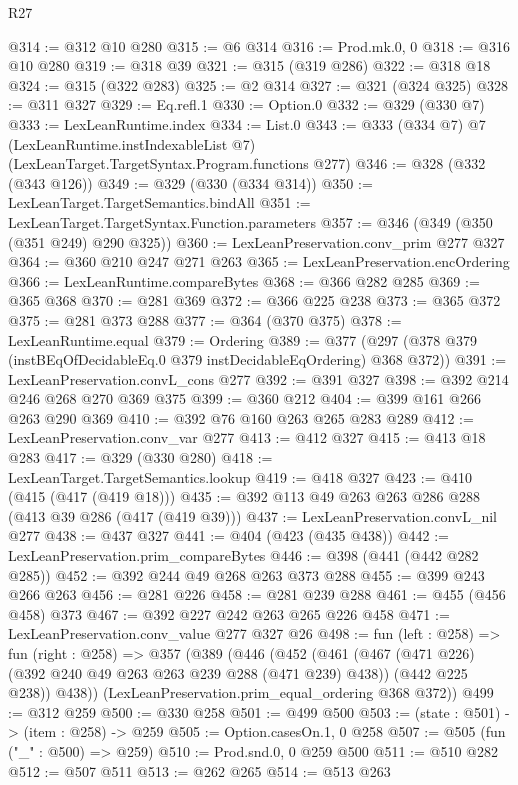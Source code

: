\begin{lexlean}{R27}
\begin{coremodule}
@314 := @312 @10 @280
@315 := @6 @314
@316 := Prod.mk.{0, 0}
@318 := @316 @10 @280
@319 := @318 @39
@321 := @315 (@319 @286)
@322 := @318 @18
@324 := @315 (@322 @283)
@325 := @2 @314
@327 := @321 (@324 @325)
@328 := @311 @327
@329 := Eq.refl.{1}
@330 := Option.{0}
@332 := @329 (@330 @7)
@333 := LexLeanRuntime.index
@334 := List.{0}
@343 := @333
    (@334 @7)
    @7
    (LexLeanRuntime.instIndexableList @7)
    (LexLeanTarget.TargetSyntax.Program.functions @277)
@346 := @328 (@332 (@343 @126))
@349 := @329 (@330 (@334 @314))
@350 := LexLeanTarget.TargetSemantics.bindAll
@351 := LexLeanTarget.TargetSyntax.Function.parameters
@357 := @346 (@349 (@350 (@351 @249) @290 @325))
@360 := LexLeanPreservation.conv_prim @277 @327
@364 := @360 @210 @247 @271 @263
@365 := LexLeanPreservation.encOrdering
@366 := LexLeanRuntime.compareBytes
@368 := @366 @282 @285
@369 := @365 @368
@370 := @281 @369
@372 := @366 @225 @238
@373 := @365 @372
@375 := @281 @373 @288
@377 := @364 (@370 @375)
@378 := LexLeanRuntime.equal
@379 := Ordering
@389 := @377 (@297 (@378 @379 (instBEqOfDecidableEq.{0} @379 instDecidableEqOrdering) @368 @372))
@391 := LexLeanPreservation.convL_cons @277
@392 := @391 @327
@398 := @392 @214 @246 @268 @270 @369 @375
@399 := @360 @212
@404 := @399 @161 @266 @263 @290 @369
@410 := @392 @76 @160 @263 @265 @283 @289
@412 := LexLeanPreservation.conv_var @277
@413 := @412 @327
@415 := @413 @18 @283
@417 := @329 (@330 @280)
@418 := LexLeanTarget.TargetSemantics.lookup
@419 := @418 @327
@423 := @410 (@415 (@417 (@419 @18)))
@435 := @392 @113 @49 @263 @263 @286 @288 (@413 @39 @286 (@417 (@419 @39)))
@437 := LexLeanPreservation.convL_nil @277
@438 := @437 @327
@441 := @404 (@423 (@435 @438))
@442 := LexLeanPreservation.prim_compareBytes
@446 := @398 (@441 (@442 @282 @285))
@452 := @392 @244 @49 @268 @263 @373 @288
@455 := @399 @243 @266 @263
@456 := @281 @226
@458 := @281 @239 @288
@461 := @455 (@456 @458) @373
@467 := @392 @227 @242 @263 @265 @226 @458
@471 := LexLeanPreservation.conv_value @277 @327 @26
@498 := fun (left : @258) =>
  fun (right : @258) =>
  @357
    (@389
      (@446
        (@452
          (@461
            (@467 (@471 @226) (@392 @240 @49 @263 @263 @239 @288 (@471 @239) @438))
            (@442 @225 @238))
          @438))
      (LexLeanPreservation.prim_equal_ordering @368 @372))
@499 := @312 @259
@500 := @330 @258
@501 := @499 @500
@503 := (state : @501) -> (item : @258) -> @259
@505 := Option.casesOn.{1, 0} @258
@507 := @505 (fun ("_" : @500) => @259)
@510 := Prod.snd.{0, 0} @259 @500
@511 := @510 @282
@512 := @507 @511
@513 := @262 @265
@514 := @513 @263

\end{coremodule}
\end{lexlean}
